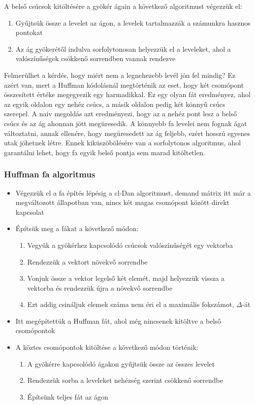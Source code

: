 \documentclass[12pt]{report}
\begin{document}
A belső csúcsok kitöltésére a gyökér ágain a következő algoritmust végezzük el:
\begin{enumerate}
	\item Gyűjtsük össze a levelet az ágon, a levelek tartalmazzák a számunkra hasznos pontokat 
	\item Az ág gyökerétől indulva sorfolytonosan helyezzük el a leveleket, ahol a valószínűségek csökkenő sorrendben vannak rendezve
\end{enumerate}

Felmerülhet a kérdés, hogy miért nem a legnehezebb levél jön fel mindig?
Ez azért van, mert a Huffman kódolásnál megtörténik az eset, hogy két csomópont összesített értéke megegyezik egy harmadikkal.
Ez egy olyan fát eredményez, ahol az egyik oldalon egy nehéz csúcs, a másik oldalon pedig két könnyű csúcs szerepel.
A naiv megoldás azt eredményezi, hogy az a nehéz pont lesz a belső csúcs és az ág ahonnan jött megüresedik.
A könnyebb fa levelei nem fognak ágat változtatni, annak ellenére, hogy megüresedett az ág feljebb, ezért hosszú egyenes utak jöhetnek létre.
Ennek kiküszöbölésére van a sorfolytonos algoritmus, ahol garantálni lehet, hogy fa egyik belső pontja sem marad kitöltetlen.

\subsubsection{Huffman fa algoritmus}
\begin{itemize}
	\item Végezzük el a fa építés lépésig a cl-Dan algoritmust, demand mátrix itt már a megváltozott állapotban van, nincs két magas csomópont között direkt kapcsolat
	\item Építsük meg a fákat a következő módon:
	\begin{enumerate}
		\item Vegyük a gyökérhez kapcsolódó csúcsok valószínűségét egy vektorba
		\item Rendezzük a vektort növekvő sorrendbe
		\item Vonjuk össze a vektor legelső két elemét, majd helyezzük vissza a vektorba és rendezzük újra a növekvő sorrendbe
		\item Ezt addig csináljuk elemek száma nem éri el a maximális fokszámot, $\Delta$-át
	\end{enumerate}
	\item Itt megépítettük a Huffman fát, ahol még nincsenek kitöltve a belső csomópontok
	\item A köztes csomópontok kitöltése a következő módon történik:
	\begin{enumerate}
		\item A gyökérre kapcsolódó ágakon gyűjtsük össze az összes levelet
		\item Rendezzük sorba a leveleket nehézség szerint csökkenő sorrendbe
		\item Építsünk teljes fát az ágon 
	\end{enumerate} 
\end{itemize}
\end{document}
